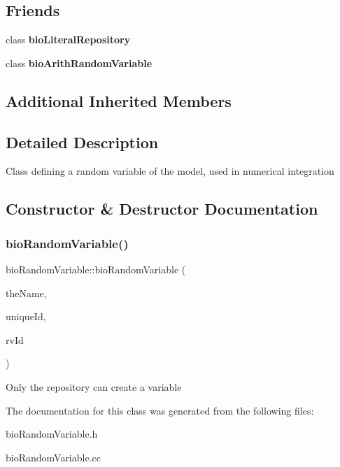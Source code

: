\subsection*{Friends}
\begin{DoxyCompactItemize}
\item 
\mbox{\label{classbio_random_variable_a6ea664ca897010b84852832942ab0274}} 
class {\bfseries bio\+Literal\+Repository}
\item 
\mbox{\label{classbio_random_variable_ade80172182a38306138b95889b380e3a}} 
class {\bfseries bio\+Arith\+Random\+Variable}
\end{DoxyCompactItemize}
\subsection*{Additional Inherited Members}


\subsection{Detailed Description}
Class defining a random variable of the model, used in numerical integration 

\subsection{Constructor \& Destructor Documentation}
\mbox{\label{classbio_random_variable_a6d089f04d982e451e9c58c4a64276156}} 
\subsubsection{\texorpdfstring{bio\+Random\+Variable()}{bioRandomVariable()}}
{\footnotesize\ttfamily bio\+Random\+Variable\+::bio\+Random\+Variable (\begin{DoxyParamCaption}\item[{pat\+String}]{the\+Name,  }\item[{pat\+U\+Long}]{unique\+Id,  }\item[{pat\+U\+Long}]{rv\+Id }\end{DoxyParamCaption})\hspace{0.3cm}{\ttfamily [protected]}}

Only the repository can create a variable 

The documentation for this class was generated from the following files\+:\begin{DoxyCompactItemize}
\item 
bio\+Random\+Variable.\+h\item 
bio\+Random\+Variable.\+cc\end{DoxyCompactItemize}
